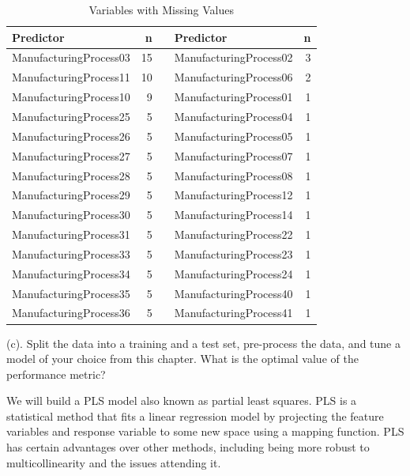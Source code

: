 \documentclass[]{report}
\begin{document}
\begin{table}[H]

\caption{\label{tab:kj-6.3b}Variables with Missing Values}
\centering
\fontsize{8}{10}\selectfont
\begin{tabular}[t]{lr>{\bfseries\raggedright\arraybackslash}p{0.1cm}lr}
\toprule
\textbf{Predictor} & \textbf{n} & \textbf{ } & \textbf{Predictor} & \textbf{n}\\
\midrule
\rowcolor{gray!6}  ManufacturingProcess03 & 15 &  & ManufacturingProcess02 & 3\\
ManufacturingProcess11 & 10 &  & ManufacturingProcess06 & 2\\
\rowcolor{gray!6}  ManufacturingProcess10 & 9 &  & ManufacturingProcess01 & 1\\
ManufacturingProcess25 & 5 &  & ManufacturingProcess04 & 1\\
\rowcolor{gray!6}  ManufacturingProcess26 & 5 &  & ManufacturingProcess05 & 1\\
\addlinespace
ManufacturingProcess27 & 5 &  & ManufacturingProcess07 & 1\\
\rowcolor{gray!6}  ManufacturingProcess28 & 5 &  & ManufacturingProcess08 & 1\\
ManufacturingProcess29 & 5 &  & ManufacturingProcess12 & 1\\
\rowcolor{gray!6}  ManufacturingProcess30 & 5 &  & ManufacturingProcess14 & 1\\
ManufacturingProcess31 & 5 &  & ManufacturingProcess22 & 1\\
\addlinespace
\rowcolor{gray!6}  ManufacturingProcess33 & 5 &  & ManufacturingProcess23 & 1\\
ManufacturingProcess34 & 5 &  & ManufacturingProcess24 & 1\\
\rowcolor{gray!6}  ManufacturingProcess35 & 5 &  & ManufacturingProcess40 & 1\\
ManufacturingProcess36 & 5 &  & ManufacturingProcess41 & 1\\
\bottomrule
\end{tabular}
\end{table}

\begin{subquestion}{(c).} Split the data into a training and a test set, pre-process the data, and tune a model of your choice from this chapter. What is the optimal value of the performance metric? 
\end{subquestion}

We will build a PLS model also known as partial least squares. PLS is a
statistical method that fits a linear regression model by projecting the
feature variables and response variable to some new space using a
mapping function. PLS has certain advantages over other methods,
including being more robust to multicollinearity and the issues
attending it.
\end{document}
